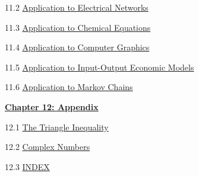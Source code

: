 \documentclass{ximera}
\begin{document}
11.2	\href{https://ximera.osu.edu/oerlinalg/LinearAlgebra/APP-0020/main}{Application to Electrical Networks}
	
11.3	\href{https://ximera.osu.edu/oerlinalg/LinearAlgebra/APP-0030/main}{Application to Chemical Equations}
	
11.4	\href{https://ximera.osu.edu/oerlinalg/LinearAlgebra/APP-0040/main}{Application to Computer Graphics}
	
11.5	\href{https://ximera.osu.edu/oerlinalg/LinearAlgebra/APP-0050/main}{Application to Input-Output Economic Models}
	
11.6	\href{https://ximera.osu.edu/oerlinalg/LinearAlgebra/APP-0060/main}{Application to Markov Chains}
	
\href{https://ximera.osu.edu/oerlinalg/LinearAlgebra/XLAChapter_appendix/main}{\textbf{Chapter 12: Appendix}}
	
12.1	\href{https://ximera.osu.edu/oerlinalg/LinearAlgebra/APX-0010/main}{The Triangle Inequality}
	
12.2	\href{https://ximera.osu.edu/oerlinalg/LinearAlgebra/APX-0020/main}{Complex Numbers}
	
12.3	\href{https://ximera.osu.edu/oerlinalg/LinearAlgebra/INDEX/main}{INDEX}
\end{document}
